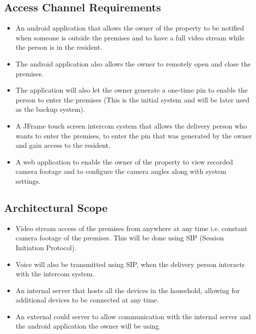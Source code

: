 \documentclass[a4paper,12pt]{article}
\begin{document}
	\subsection{Access Channel Requirements}
	\begin{itemize}
		\item An android application that allows the owner of the property to be notified when someone is outside the premises and to have a full video stream while the person is in the resident.
		
		\item The android application also allows the owner to remotely open and close the premises.
		
		\item The application will also let the owner generate a one-time pin to enable the person to enter the premises (This is the initial system and will be later used as the backup system).  
		
		\item A JFrame touch screen intercom system that allows the delivery person who wants to enter the premises, to enter the pin that was generated by the owner and gain access to the resident.
		
		\item A web application to enable the owner of the property to view recorded camera footage and to configure the camera angles along with system settings. 
	\end{itemize}
	
	\newpage
	\subsection{Architectural Scope}
	\begin{itemize}
		\item Video stream access of the premises from anywhere at any time i.e. constant camera footage of the premises. This will be done using SIP (Session Initiation Protocol).
		
		\item Voice will also be transmitted using SIP, when the delivery person interacts with the intercom system.
		
		\item An internal server that hosts all the devices in the household, allowing for additional devices to be connected at any time. 
		
		\item An external could server to allow communication with the internal server and the android application the owner will be using. 
	\end{itemize}
	
\end{document}
